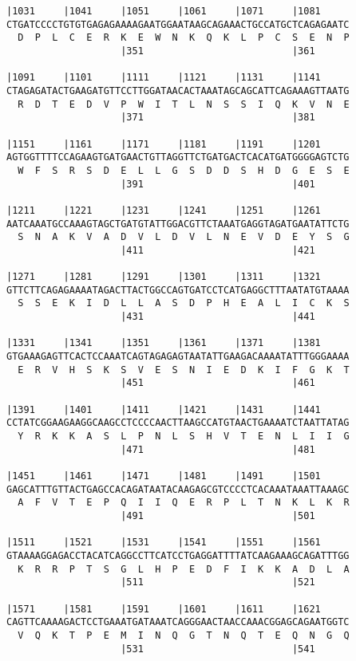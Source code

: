 \documentclass{article}
\begin{document}
\begin{Verbatim}
|1031     |1041     |1051     |1061     |1071     |1081     
CTGATCCCCTGTGTGAGAGAAAAGAATGGAATAAGCAGAAACTGCCATGCTCAGAGAATC
  D  P  L  C  E  R  K  E  W  N  K  Q  K  L  P  C  S  E  N  P
                    |351                          |361      
  
|1091     |1101     |1111     |1121     |1131     |1141     
CTAGAGATACTGAAGATGTTCCTTGGATAACACTAAATAGCAGCATTCAGAAAGTTAATG
  R  D  T  E  D  V  P  W  I  T  L  N  S  S  I  Q  K  V  N  E
                    |371                          |381      
  
|1151     |1161     |1171     |1181     |1191     |1201     
AGTGGTTTTCCAGAAGTGATGAACTGTTAGGTTCTGATGACTCACATGATGGGGAGTCTG
  W  F  S  R  S  D  E  L  L  G  S  D  D  S  H  D  G  E  S  E
                    |391                          |401      
  
|1211     |1221     |1231     |1241     |1251     |1261     
AATCAAATGCCAAAGTAGCTGATGTATTGGACGTTCTAAATGAGGTAGATGAATATTCTG
  S  N  A  K  V  A  D  V  L  D  V  L  N  E  V  D  E  Y  S  G
                    |411                          |421      
  
|1271     |1281     |1291     |1301     |1311     |1321     
GTTCTTCAGAGAAAATAGACTTACTGGCCAGTGATCCTCATGAGGCTTTAATATGTAAAA
  S  S  E  K  I  D  L  L  A  S  D  P  H  E  A  L  I  C  K  S
                    |431                          |441      
  
|1331     |1341     |1351     |1361     |1371     |1381     
GTGAAAGAGTTCACTCCAAATCAGTAGAGAGTAATATTGAAGACAAAATATTTGGGAAAA
  E  R  V  H  S  K  S  V  E  S  N  I  E  D  K  I  F  G  K  T
                    |451                          |461      
  
|1391     |1401     |1411     |1421     |1431     |1441     
CCTATCGGAAGAAGGCAAGCCTCCCCAACTTAAGCCATGTAACTGAAAATCTAATTATAG
  Y  R  K  K  A  S  L  P  N  L  S  H  V  T  E  N  L  I  I  G
                    |471                          |481      
  
|1451     |1461     |1471     |1481     |1491     |1501     
GAGCATTTGTTACTGAGCCACAGATAATACAAGAGCGTCCCCTCACAAATAAATTAAAGC
  A  F  V  T  E  P  Q  I  I  Q  E  R  P  L  T  N  K  L  K  R
                    |491                          |501      
  
|1511     |1521     |1531     |1541     |1551     |1561     
GTAAAAGGAGACCTACATCAGGCCTTCATCCTGAGGATTTTATCAAGAAAGCAGATTTGG
  K  R  R  P  T  S  G  L  H  P  E  D  F  I  K  K  A  D  L  A
                    |511                          |521      
  
|1571     |1581     |1591     |1601     |1611     |1621     
CAGTTCAAAAGACTCCTGAAATGATAAATCAGGGAACTAACCAAACGGAGCAGAATGGTC
  V  Q  K  T  P  E  M  I  N  Q  G  T  N  Q  T  E  Q  N  G  Q
                    |531                          |541      
  

\end{Verbatim}
\end{document}
